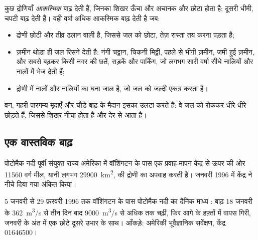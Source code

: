 कुछ द्रोणियाँ \emph{आकस्मिक} बाढ़ देती हैं, जिनका शिखर ऊँचा और अचानक और 
छोटा होता है; दूसरी धीमी, चपटी बाढ़ देती हैं। वही वर्षा अधिक आकस्मिक बाढ़
देती है जब:
\begin{itemize}
  \item द्रोणी छोटी और तीव्र ढलान वाली है, जिससे जल को छोटा, तेज़
        रास्ता तय करना पड़ता है;
  \item ज़मीन थोड़ा ही जल रिसने देती है: नंगी चट्टान, चिकनी मिट्टी, पहले से
        भीगी ज़मीन, जमी हुई ज़मीन, और सबसे बढ़कर किसी नगर की छतें, सड़कें और
        पार्किंग, जो लगभग सारी वर्षा सीधे नालियों
        और नालों में भेज देती हैं;
  \item द्रोणी में नालों और नालियों का घना जाल है, जो
        जल को जल्दी एकत्र करता है।
\end{itemize}
वन, गहरी पारगम्य मृदाएँ और चौड़े बाढ़ के मैदान इसका उलटा करते हैं: वे
जल को रोककर धीरे-धीरे छोड़ते हैं, जिससे शिखर नीचा होता है और देर से आता है।

\subsection*{एक वास्तविक बाढ़}

पोटोमैक नदी पूर्वी संयुक्त राज्य अमेरिका में वॉशिंगटन के पास एक प्रवाह-मापन केंद्र से
ऊपर की ओर \num{11560} वर्ग मील, यानी लगभग
\qty{29900}{km^2}, की द्रोणी का अपवाह करती है। जनवरी 1996 में केंद्र ने
नीचे दिया गया  अंकित किया।

\begin{omfigure}

{\small 5 जनवरी से 29 फ़रवरी 1996 तक वॉशिंगटन के पास पोटोमैक नदी का दैनिक माध्य
: बाढ़ 18 जनवरी के \qty{362}{m^3/s} से
तीन दिन बाद \qty{9000}{m^3/s} से अधिक तक चढ़ी, फिर आगे के
हफ़्तों में वापस गिरी, जनवरी के अंत में एक छोटे दूसरे उभार के साथ। आँकड़े: अमेरिकी
भूवैज्ञानिक सर्वेक्षण, केंद्र 01646500।}
\end{omfigure}

